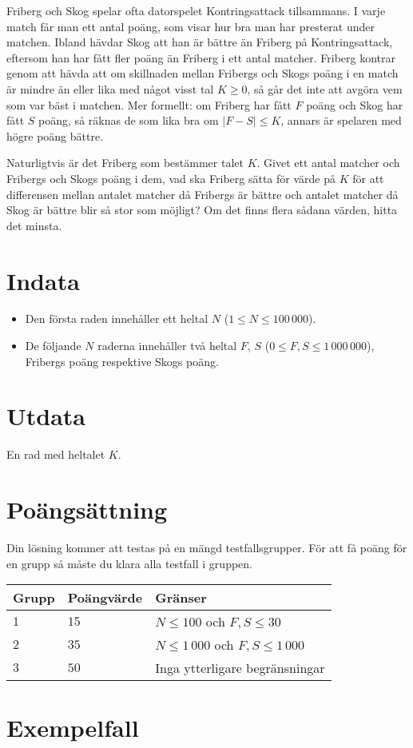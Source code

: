 
Friberg och Skog spelar ofta datorspelet Kontringsattack tillsammans. I varje match får man ett antal poäng, som visar hur bra man har presterat under matchen. Ibland hävdar Skog att han är bättre än Friberg på Kontringsattack, eftersom han har fått fler poäng än Friberg i ett antal matcher. Friberg kontrar genom att hävda att om skillnaden mellan Fribergs och Skogs poäng i en match är mindre än eller lika med något visst tal $K\ge 0$, så går det inte att avgöra vem som var bäst i matchen. Mer formellt: om Friberg har fått $F$ poäng och Skog har fått $S$ poäng, så räknas de som lika bra om $|F - S| \le K$, annars är spelaren med högre poäng bättre.

Naturligtvis är det Friberg som bestämmer talet $K$. Givet ett antal matcher och Fribergs och Skogs poäng i dem, vad ska Friberg sätta för värde på $K$ för att differensen mellan antalet matcher då Fribergs är bättre och antalet matcher då Skog är bättre blir så stor som möjligt? Om det finns flera sådana värden, hitta det minsta.

\section*{Indata}
\begin{itemize}
  \item Den första raden innehåller ett heltal $N$ ($1 \le N \le 100\,000$).

  \item De följande $N$ raderna innehåller två heltal $F$, $S$ ($0 \le F, S \le 1\,000\,000$), Fribergs poäng respektive Skogs poäng.

\end{itemize}

\section*{Utdata}
En rad med heltalet $K$.

\section*{Poängsättning}
Din lösning kommer att testas på en mängd testfallsgrupper.
För att få poäng för en grupp så måste du klara alla testfall i gruppen.


\noindent
\begin{tabular}{| l | l | l |}
  \hline
  Grupp & Poängvärde & Gränser \\ \hline
  $1$    & $15$      & $N \le 100$ och $F,S\le 30$ \\ \hline
  $2$    & $35$      & $N \le 1\,000$ och $F,S\le 1\,000$\\ \hline
  $3$    & $50$      & Inga ytterligare begränsningar \\ \hline
\end{tabular}

\section*{Exempelfall}
